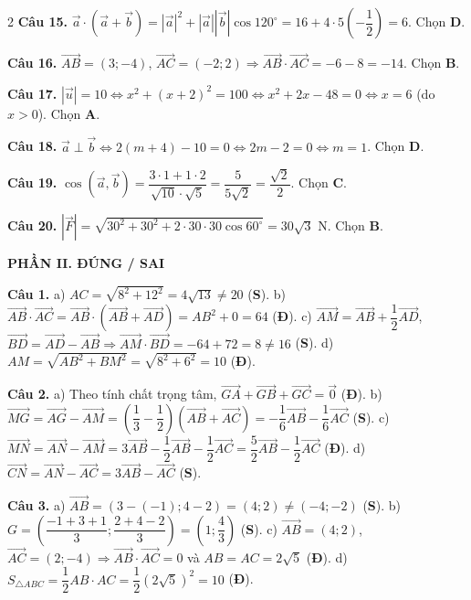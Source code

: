 \documentclass[10pt,a4paper]{article}
\begin{document}
\begin{multicols}{2}
\textbf{Câu 15.} $\vec{a}\cdot(\vec{a} + \vec{b}) = |\vec{a}|^2 + |\vec{a}||\vec{b}|\cos 120^\circ = 16 + 4\cdot 5\left(-\dfrac{1}{2}\right) = 6$. Chọn \textbf{D}.

\textbf{Câu 16.} $\vec{AB} = (3; -4)$, $\vec{AC} = (-2; 2) \Rightarrow \vec{AB}\cdot\vec{AC} = -6 - 8 = -14$. Chọn \textbf{B}.

\textbf{Câu 17.} $|\vec{u}| = 10 \Leftrightarrow x^2 + (x + 2)^2 = 100 \Leftrightarrow x^2 + 2x - 48 = 0 \Leftrightarrow x = 6$ (do $x > 0$). Chọn \textbf{A}.

\textbf{Câu 18.} $\vec{a} \perp \vec{b} \Leftrightarrow 2(m + 4) - 10 = 0 \Leftrightarrow 2m - 2 = 0 \Leftrightarrow m = 1$. Chọn \textbf{D}.

\textbf{Câu 19.} $\cos(\vec{a}, \vec{b}) = \dfrac{3\cdot 1 + 1\cdot 2}{\sqrt{10}\cdot\sqrt{5}} = \dfrac{5}{5\sqrt{2}} = \dfrac{\sqrt{2}}{2}$. Chọn \textbf{C}.

\textbf{Câu 20.} $|\vec{F}| = \sqrt{30^2 + 30^2 + 2\cdot 30\cdot 30\cos 60^\circ} = 30\sqrt{3}\text{ N}$. Chọn \textbf{B}.

\textbf{\color{brandDark}\textsf{PHẦN II. ĐÚNG / SAI}}

\textbf{Câu 1.}
a) $AC = \sqrt{8^2 + 12^2} = 4\sqrt{13} \neq 20$ (\textbf{S}).
b) $\vec{AB}\cdot\vec{AC} = \vec{AB}\cdot(\vec{AB} + \vec{AD}) = AB^2 + 0 = 64$ (\textbf{Đ}).
c) $\vec{AM} = \vec{AB} + \dfrac{1}{2}\vec{AD}$, $\vec{BD} = \vec{AD} - \vec{AB} \Rightarrow \vec{AM}\cdot\vec{BD} = -64 + 72 = 8 \neq 16$ (\textbf{S}).
d) $AM = \sqrt{AB^2 + BM^2} = \sqrt{8^2 + 6^2} = 10$ (\textbf{Đ}).

\textbf{Câu 2.}
a) Theo tính chất trọng tâm, $\vec{GA} + \vec{GB} + \vec{GC} = \vec{0}$ (\textbf{Đ}).
b) $\vec{MG} = \vec{AG} - \vec{AM} = \left(\dfrac{1}{3} - \dfrac{1}{2}\right)(\vec{AB} + \vec{AC}) = -\dfrac{1}{6}\vec{AB} - \dfrac{1}{6}\vec{AC}$ (\textbf{S}).
c) $\vec{MN} = \vec{AN} - \vec{AM} = 3\vec{AB} - \dfrac{1}{2}\vec{AB} - \dfrac{1}{2}\vec{AC} = \dfrac{5}{2}\vec{AB} - \dfrac{1}{2}\vec{AC}$ (\textbf{Đ}).
d) $\vec{CN} = \vec{AN} - \vec{AC} = 3\vec{AB} - \vec{AC}$ (\textbf{S}).

\textbf{Câu 3.}
a) $\vec{AB} = (3 - (-1); 4 - 2) = (4; 2) \neq (-4; -2)$ (\textbf{S}).
b) $G = \left(\dfrac{-1 + 3 + 1}{3}; \dfrac{2 + 4 - 2}{3}\right) = \left(1; \dfrac{4}{3}\right)$ (\textbf{S}).
c) $\vec{AB} = (4; 2)$, $\vec{AC} = (2; -4) \Rightarrow \vec{AB}\cdot\vec{AC} = 0$ và $AB = AC = 2\sqrt{5}$ (\textbf{Đ}).
d) $S_{\triangle ABC} = \dfrac{1}{2}AB\cdot AC = \dfrac{1}{2}(2\sqrt{5})^2 = 10$ (\textbf{Đ}).


\end{multicols}
\end{document}
